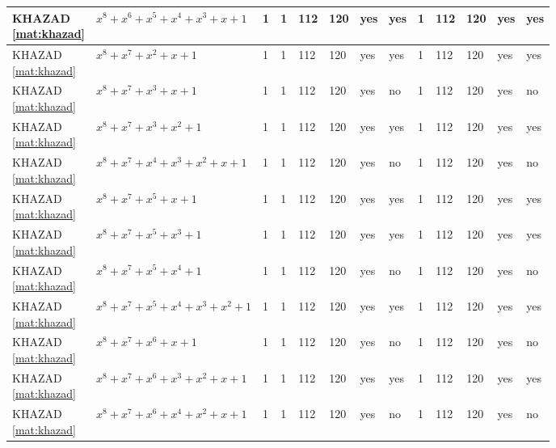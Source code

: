 \begin{tiny}
\begin{longtable}{|l|l|l|l|l|l|l|l|l|l|l|l|l|}
\shortstack{KHAZAD \\ \eqref{mat:khazad}} & $x^8 + x^6 + x^5 + x^4 + x^3 + x + 1$ & 1 & 1 & 112 & 120 & yes & yes & 1 & 112 & 120 & yes & yes \\ \hline
\shortstack{KHAZAD \\ \eqref{mat:khazad}} & $x^8 + x^7 + x^2 + x + 1$ & 1 & 1 & 112 & 120 & yes & yes & 1 & 112 & 120 & yes & yes \\ \hline
\shortstack{KHAZAD \\ \eqref{mat:khazad}} & $x^8 + x^7 + x^3 + x + 1$ & 1 & 1 & 112 & 120 & yes & no & 1 & 112 & 120 & yes & no \\ \hline
\shortstack{KHAZAD \\ \eqref{mat:khazad}} & $x^8 + x^7 + x^3 + x^2 + 1$ & 1 & 1 & 112 & 120 & yes & yes & 1 & 112 & 120 & yes & yes \\ \hline
\shortstack{KHAZAD \\ \eqref{mat:khazad}} & $x^8 + x^7 + x^4 + x^3 + x^2 + x + 1$ & 1 & 1 & 112 & 120 & yes & no & 1 & 112 & 120 & yes & no \\ \hline
\shortstack{KHAZAD \\ \eqref{mat:khazad}} & $x^8 + x^7 + x^5 + x + 1$ & 1 & 1 & 112 & 120 & yes & yes & 1 & 112 & 120 & yes & yes \\ \hline
\shortstack{KHAZAD \\ \eqref{mat:khazad}} & $x^8 + x^7 + x^5 + x^3 + 1$ & 1 & 1 & 112 & 120 & yes & yes & 1 & 112 & 120 & yes & yes \\ \hline
\shortstack{KHAZAD \\ \eqref{mat:khazad}} & $x^8 + x^7 + x^5 + x^4 + 1$ & 1 & 1 & 112 & 120 & yes & no & 1 & 112 & 120 & yes & no \\ \hline
\shortstack{KHAZAD \\ \eqref{mat:khazad}} & $x^8 + x^7 + x^5 + x^4 + x^3 + x^2 + 1$ & 1 & 1 & 112 & 120 & yes & yes & 1 & 112 & 120 & yes & yes \\ \hline
\shortstack{KHAZAD \\ \eqref{mat:khazad}} & $x^8 + x^7 + x^6 + x + 1$ & 1 & 1 & 112 & 120 & yes & no & 1 & 112 & 120 & yes & no \\ \hline
\shortstack{KHAZAD \\ \eqref{mat:khazad}} & $x^8 + x^7 + x^6 + x^3 + x^2 + x + 1$ & 1 & 1 & 112 & 120 & yes & yes & 1 & 112 & 120 & yes & yes \\ \hline
\shortstack{KHAZAD \\ \eqref{mat:khazad}} & $x^8 + x^7 + x^6 + x^4 + x^2 + x + 1$ & 1 & 1 & 112 & 120 & yes & no & 1 & 112 & 120 & yes & no \\ \hline

\end{longtable}
\end{tiny}
